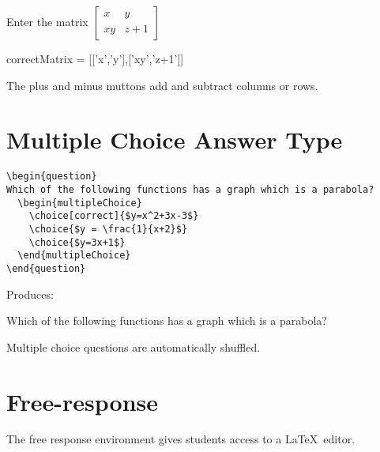 \documentclass{ximera}
\begin{document}
\begin{question}
  Enter the matrix  \(\begin{bmatrix} x & y \\ xy & z+1 \end{bmatrix}\)
  \begin{matrixAnswer}
    correctMatrix = [['x','y'],['xy','z+1']]
  \end{matrixAnswer}
\end{question}

\begin{remark}
  The plus and minus muttons add and subtract columns or rows.  
\end{remark}



\section{Multiple Choice Answer Type}

\begin{verbatim}
\begin{question}
Which of the following functions has a graph which is a parabola?
  \begin{multipleChoice}
    \choice[correct]{$y=x^2+3x-3$}
    \choice{$y = \frac{1}{x+2}$}
    \choice{$y=3x+1$}
  \end{multipleChoice}
\end{question}
\end{verbatim}

Produces:

\begin{question}
  Which of the following functions has a graph which is a parabola?
  \begin{multipleChoice}
  \end{multipleChoice}
\end{question}

\begin{remark}
  Multiple choice questions are automatically shuffled.
\end{remark}



\section{Free-response}

The free response environment gives students access to a \LaTeX\ editor. 
\end{document}
